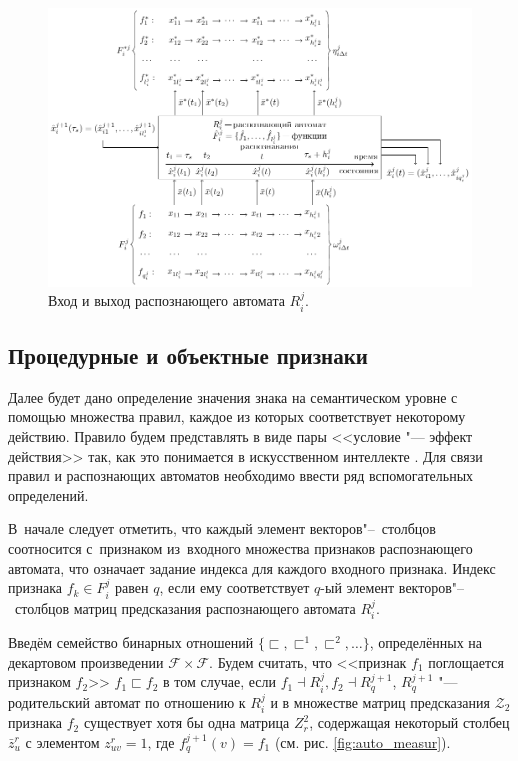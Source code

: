 \documentclass[a4paper, 12pt]{article}
\theoremstyle{plain}
\begin{document}
	\begin{figure}[h]
		\centering
		\includegraphics[width=1.0\linewidth]{rb_io}
		\caption{Вход и выход распознающего автомата $R_i^j$.}
		\label{fig:rb_io}
	\end{figure}

	\subsection{Процедурные и объектные признаки}
	Далее будет дано определение значения знака на семантическом уровне с помощью множества правил, каждое из которых соответствует некоторому действию. Правило будем представлять в виде пары <<условие "--- эффект действия>> так, как это понимается в искусственном интеллекте \cite{Nilson1985}. Для связи правил и распознающих автоматов необходимо ввести ряд вспомогательных определений. 

	В~начале следует отметить, что каждый элемент векторов"--~столбцов соотносится с~признаком из~входного множества признаков распознающего автомата, что означает задание индекса для каждого входного признака. Индекс признака $f_k\in F_i^j$ равен  $q$, если ему соответствует $q$-ый элемент векторов"--~столбцов матриц предсказания распознающего автомата $R_i^j$. 
	
	Введём семейство бинарных отношений $\{\sqsubset,\sqsubset^1,\sqsubset^2,\dots\}$, определённых на декартовом произведении $\mathcal F\times \mathcal F$. Будем считать, что <<признак $f_1$ поглощается признаком $f_2$>> $f_1\sqsubset f_2$ в том случае, если $f_1\dashv R_i^j, f_2\dashv R_q^{j+1}$, $R_q^{j+1}$ "--- родительский автомат по отношению к $R_i^j$ и в множестве матриц предсказания $\mathcal Z_2$ признака $f_2$ существует хотя бы одна матрица $Z_r^2$, содержащая некоторый столбец $\bar z_u^r$ с элементом $z_{uv}^r=1$, где $f_q^{j+1}(v)=f_1$ (см. рис. \ref{fig:auto_measur}).
		
\end{document}
